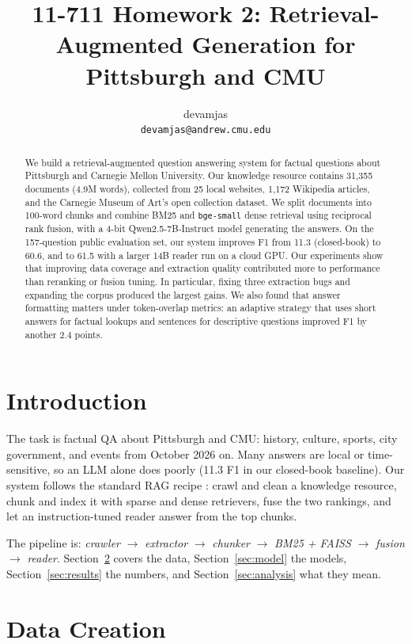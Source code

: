 \documentclass[11pt]{article}
\title{11-711 Homework 2: Retrieval-Augmented Generation for Pittsburgh and CMU}
\author{
  devamjas \\
  \texttt{devamjas@andrew.cmu.edu} \\[4pt]
}
\begin{document}
\maketitle

\begin{abstract}
We build a retrieval-augmented question answering system for factual questions about Pittsburgh and Carnegie Mellon University. Our knowledge resource contains 31,355 documents (4.9M words), collected from 25 local websites, 1,172 Wikipedia articles, and the Carnegie Museum of Art's open collection dataset. We split documents into 100-word chunks and combine BM25 and \texttt{bge-small} dense retrieval using reciprocal rank fusion, with a 4-bit Qwen2.5-7B-Instruct model generating the answers. On the 157-question public evaluation set, our system improves F1 from 11.3 (closed-book) to 60.6, and to 61.5 with a larger 14B reader run on a cloud GPU. Our experiments show that improving data coverage and extraction quality contributed more to performance than reranking or fusion tuning. In particular, fixing three extraction bugs and expanding the corpus produced the largest gains. We also found that answer formatting matters under token-overlap metrics: an adaptive strategy that uses short answers for factual lookups and sentences for descriptive questions improved F1 by another 2.4 points.
\end{abstract}

\section{Introduction}

The task is factual QA about Pittsburgh and CMU: history, culture, sports, city government, and events from October 2026 on. Many answers are local or time-sensitive, so an LLM alone does poorly (11.3 F1 in our closed-book baseline). Our system follows the standard RAG recipe \citep{lewis2021rag}: crawl and clean a knowledge resource, chunk and index it with sparse and dense retrievers, fuse the two rankings, and let an instruction-tuned reader answer from the top chunks.

The pipeline is: \emph{crawler} $\rightarrow$ \emph{extractor} $\rightarrow$ \emph{chunker} $\rightarrow$ \emph{BM25 + FAISS} $\rightarrow$ \emph{fusion} $\rightarrow$ \emph{reader}. Section~\ref{sec:data} covers the data, Section~\ref{sec:model} the models, Section~\ref{sec:results} the numbers, and Section~\ref{sec:analysis} what they mean.

\section{Data Creation}
\label{sec:data}
\end{document}
